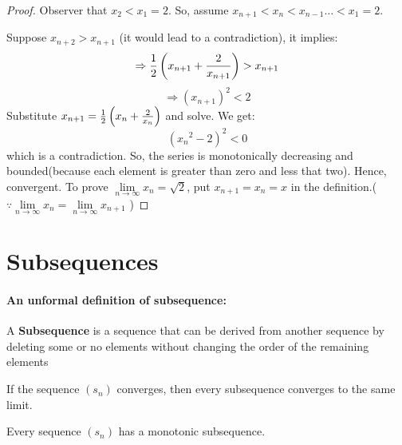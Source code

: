 \documentclass{notes}
\begin{document}
\begin{proof}
	Observer that $x_2 < x_1 = 2$. So, assume $x_{n+1}<x_{n}<x_{n-1}\ldots<x_1 = 2$.
	
	Suppose $x_{n+2}>x_{n+1}$ (it would lead to a contradiction), it implies:
	$$ \Rightarrow {1 \over 2}\left(x_{n+1} + {2 \over x_{n+1}}\right) > x_{n+1}$$
	$$ \Rightarrow (x_{n+1})^2<2$$
	Substitute $x_{n+1} = {1 \over 2}\left(x_n + {2 \over x_n}\right)$ and solve. We get:
	$$ ({x_{n}}^2 - 2)^2 <0$$
	which is a contradiction. So, the series is monotonically decreasing and bounded(because each element is greater than zero and less that two). Hence, convergent.
	To prove $\lim\limits_{n \to \infty} x_n = \sqrt{2}$, put $x_{n+1} = x_n = x$ in the definition.($\because \lim\limits_{n \to \infty} x_n = \lim\limits_{n \to \infty} x_{n+1}$ )
\end{proof}
\paragraph{}
\section{Subsequences}

\paragraph{An unformal definition of subsequence:}


A \textbf{Subsequence} is a sequence that can be derived from another sequence by deleting some or no elements
without changing the order of the remaining elements

\begin{theorem}{}
	If the sequence $(s_n)$ converges, then every subsequence converges to
	the same limit.
\end{theorem}


\begin{theorem}{}
	Every sequence $(s_n)$ has a monotonic subsequence.
	
\end{theorem}
\end{document}
